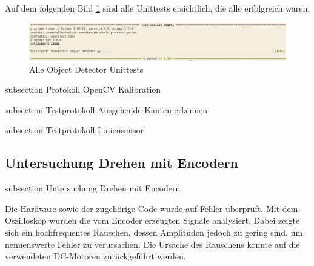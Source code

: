 Auf dem folgenden Bild \ref{img:object_detector_unittests} sind alle Unittests ersichtlich, die alle erfolgreich waren.

\begin{figure}[H]
\centering
\includegraphics[width=\textwidth]{assets/IT/testing/yolo/object-detector-unittests.png}
\caption{Alle Object Detector Unittests}
\label{img:object_detector_unittests}
\end{figure}

{subsection}
{Protokoll OpenCV Kalibration}





{subsection}
{Testprotokoll Ausgehende Kanten erkennen}





{subsection}
{Testprotokoll Liniensensor}






\newpage
\subsection*{Untersuchung Drehen mit Encodern}\label{drehen-encoder}
    {subsection}
    {Untersuchung Drehen mit Encodern}

Die Hardware sowie der zugehörige Code wurde auf Fehler überprüft. Mit dem Oszilloskop wurden die vom Encoder erzeugten Signale analysiert. Dabei zeigte sich ein hochfrequentes Rauschen, dessen Amplituden jedoch zu gering sind, um nennenswerte Fehler zu verursachen. Die Ursache des Rauschens konnte auf die verwendeten DC-Motoren zurückgeführt werden.

